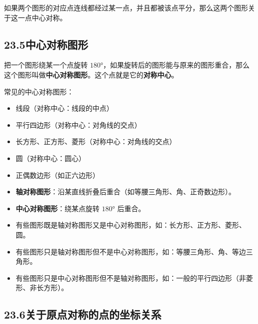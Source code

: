 \documentclass[12pt, a4paper]{ctexart}
\begin{document}
\begin{knowledgebox}[中心对称的判定]
如果两个图形的对应点连线都经过某一点，并且都被该点平分，那么这两个图形关于这一点中心对称。
\end{knowledgebox}

\subsection*{23.5\quad 中心对称图形}

\begin{knowledgebox}[中心对称图形]
把一个图形绕某一个点旋转 $180°$，如果旋转后的图形能与原来的图形重合，那么这个图形叫做\textbf{中心对称图形}。这个点就是它的\textbf{对称中心}。

常见的中心对称图形：
\begin{itemize}[nosep]
  \item 线段（对称中心：线段的中点）
  \item 平行四边形（对称中心：对角线的交点）
  \item 长方形、正方形、菱形（对称中心：对角线的交点）
  \item 圆（对称中心：圆心）
  \item 正偶数边形（如正六边形）
\end{itemize}
\end{knowledgebox}

\begin{warnbox}
\begin{itemize}[nosep]
  \item \textbf{轴对称图形}：沿某直线折叠后重合（如等腰三角形、角、正奇数边形）。
  \item \textbf{中心对称图形}：绕某点旋转 $180°$ 后重合。
  \item 有些图形既是轴对称图形又是中心对称图形，如：长方形、正方形、菱形、圆。
  \item 有些图形只是轴对称图形但不是中心对称图形，如：等腰三角形、角、等边三角形。
  \item 有些图形只是中心对称图形但不是轴对称图形，如：一般的平行四边形（非菱形、非长方形）。
\end{itemize}
\end{warnbox}

\subsection*{23.6\quad 关于原点对称的点的坐标关系}
\end{document}
